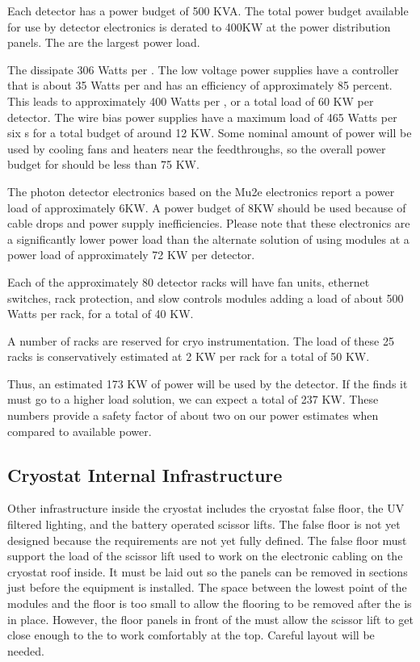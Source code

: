 Each detector has a power budget of 500 KVA. The total power budget available for use by detector electronics is derated to 400KW at the power distribution panels.  The  are the largest power load.  

The  dissipate 306 Watts per .  The low voltage power supplies have a controller that is about 35 Watts per  and has an efficiency of approximately 85 percent.  This leads to approximately 400 Watts per , or a total load of 60 KW per detector.  The  wire bias power supplies have a maximum load of 465 Watts per six s for a total budget of around 12 KW.  Some nominal amount of power will be used by cooling fans and heaters near the feedthroughs, so the overall power budget for  should be less than 75 KW.

The photon detector electronics based on the Mu2e electronics report a power load of approximately 6KW.  A power budget of 8KW should be used because of cable drops and  power supply inefficiencies.  Please note that these  electronics are a significantly lower power load than the alternate  solution of using  modules at a power load of approximately 72 KW per detector.

Each of the approximately 80 detector racks will have fan units, ethernet switches, rack protection, and slow controls modules adding a load of about 500 Watts per rack, for a total of 40 KW.

A number of racks are reserved for cryo instrumentation.  The load of these 25 racks is conservatively estimated at 2 KW per rack for a total of 50 KW.

Thus, an estimated 173 KW of power will be used by the detector.  If the  finds it must go to a higher load  solution, we can expect a total of 237 KW.  These numbers provide a safety factor of about two on our power estimates when compared to available power.


\subsection{Cryostat Internal Infrastructure}
\label{sec:fdsp-tc-infr-cryo-int}




Other infrastructure inside the cryostat includes the cryostat false floor, the UV filtered lighting, and the battery operated scissor lifts. The false floor is not yet designed because the requirements are not yet fully defined. The false floor must support the load of the scissor lift used to work on the electronic cabling on the cryostat roof inside. It must be laid out so the panels can be removed in sections just before the equipment is installed. The space between the lowest point of the  modules and the floor is too small to allow the flooring to be removed after the  is in place. However, the floor panels in front of the  must allow the scissor lift to get close enough to the  to work comfortably at the top. Careful layout will be needed. 

